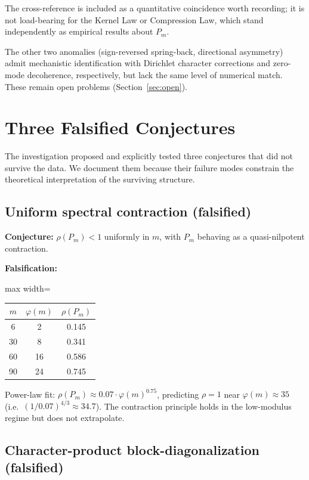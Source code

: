 \documentclass[11pt,a4paper]{article}
\begin{document}
The cross-reference is included as a quantitative coincidence worth recording; it is not load-bearing for the Kernel Law or Compression Law, which stand independently as empirical results about $P_m$.

The other two anomalies (sign-reversed spring-back, directional asymmetry) admit mechanistic identification with Dirichlet character corrections and zero-mode decoherence, respectively, but lack the same level of numerical match. These remain open problems (Section~\ref{sec:open}).

\section{Three Falsified Conjectures}
\label{sec:falsified}

The investigation proposed and explicitly tested three conjectures that did not survive the data. We document them because their failure modes constrain the theoretical interpretation of the surviving structure.

\subsection{Uniform spectral contraction (falsified)}

\textbf{Conjecture:} $\rho(P_m) < 1$ uniformly in $m$, with $P_m$ behaving as a quasi-nilpotent contraction.

\textbf{Falsification:}
\begin{center}
\begin{adjustbox}{max width=\linewidth}\begin{tabular}{ccc}
\toprule
$m$ & $\varphi(m)$ & $\rho(P_m)$ \\
\midrule
6 & 2 & 0.145 \\
30 & 8 & 0.341 \\
60 & 16 & 0.586 \\
90 & 24 & 0.745 \\
\bottomrule
\end{tabular}\end{adjustbox}
\end{center}
Power-law fit: $\rho(P_m) \approx 0.07 \cdot \varphi(m)^{0.75}$, predicting $\rho = 1$ near $\varphi(m) \approx 35$ (i.e.\ $(1/0.07)^{4/3} \approx 34.7$). The contraction principle holds in the low-modulus regime but does not extrapolate.

\subsection{Character-product block-diagonalization (falsified)}
\end{document}
